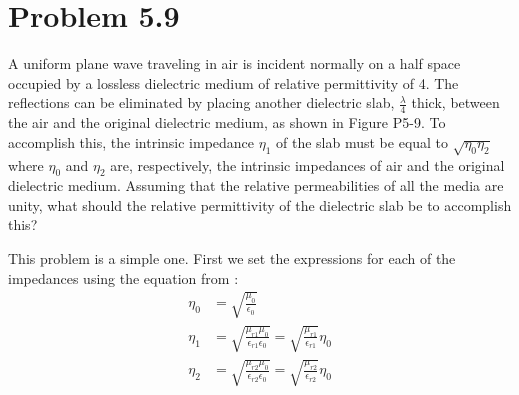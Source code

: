 \documentclass[12pt]{article}
\begin{document}
\section*{Problem 5.9}

A uniform plane wave traveling in air is incident normally on a half space occupied by a lossless dielectric medium of relative permittivity of 4. The reflections can be eliminated by placing another dielectric slab, $\frac{\lambda}{4}$ thick, between the air and the original dielectric medium, as shown in Figure P5-9. To accomplish this, the intrinsic impedance $\eta_1$ of the slab must be equal to $\sqrt{\eta_0\eta_2}$ where $\eta_0$ and $\eta_2$ are, respectively, the intrinsic impedances of air and the original dielectric medium. Assuming that the relative permeabilities of all the media are unity, what should the relative permittivity of the dielectric slab be to accomplish this?
\begin{center}
\end{center}
This problem is a simple one. First we set the expressions for each of the impedances using the equation from \cite{balanis_2012}:
\begin{align*}
  \eta_0 &= \sqrt{\frac{\mu_0}{\epsilon_0}}\\
  \eta_1 &= \sqrt{\frac{\mu_{r1}\mu_{0}}{\epsilon_{r1}\epsilon_{0}}} = \sqrt{\frac{\mu_{r1}}{\epsilon_{r1}}}\eta_0\\
  \eta_2 &= \sqrt{\frac{\mu_{r2}\mu_{0}}{\epsilon_{r2}\epsilon_{0}}} = \sqrt{\frac{\mu_{r2}}{\epsilon_{r2}}}\eta_0
\end{align*}
\end{document}
